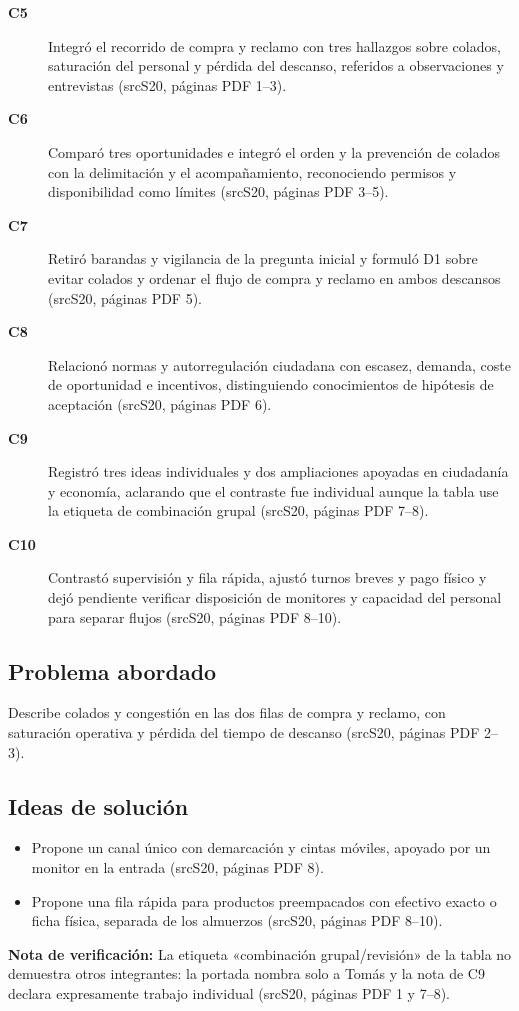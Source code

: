 \documentclass[11pt,a4paper]{article}
\newcommand{\evid}[2]{(\csname src#1\endcsname, páginas PDF #2)}
\begin{document}
\begin{description}
\item[\textbf{C5}] Integró el recorrido de compra y reclamo con tres hallazgos sobre colados, saturación del personal y pérdida del descanso, referidos a observaciones y entrevistas \evid{S20}{1--3}.
\item[\textbf{C6}] Comparó tres oportunidades e integró el orden y la prevención de colados con la delimitación y el acompañamiento, reconociendo permisos y disponibilidad como límites \evid{S20}{3--5}.
\item[\textbf{C7}] Retiró barandas y vigilancia de la pregunta inicial y formuló D1 sobre evitar colados y ordenar el flujo de compra y reclamo en ambos descansos \evid{S20}{5}.
\item[\textbf{C8}] Relacionó normas y autorregulación ciudadana con escasez, demanda, coste de oportunidad e incentivos, distinguiendo conocimientos de hipótesis de aceptación \evid{S20}{6}.
\item[\textbf{C9}] Registró tres ideas individuales y dos ampliaciones apoyadas en ciudadanía y economía, aclarando que el contraste fue individual aunque la tabla use la etiqueta de combinación grupal \evid{S20}{7--8}.
\item[\textbf{C10}] Contrastó supervisión y fila rápida, ajustó turnos breves y pago físico y dejó pendiente verificar disposición de monitores y capacidad del personal para separar flujos \evid{S20}{8--10}.
\end{description}
\subsection*{Problema abordado}
Describe colados y congestión en las dos filas de compra y reclamo, con saturación operativa y pérdida del tiempo de descanso \evid{S20}{2--3}.
\subsection*{Ideas de solución}
\begin{itemize}
\item Propone un canal único con demarcación y cintas móviles, apoyado por un monitor en la entrada \evid{S20}{8}.
\item Propone una fila rápida para productos preempacados con efectivo exacto o ficha física, separada de los almuerzos \evid{S20}{8--10}.
\end{itemize}
{\small\textbf{Nota de verificación:} La etiqueta «combinación grupal/revisión» de la tabla no demuestra otros integrantes: la portada nombra solo a Tomás y la nota de C9 declara expresamente trabajo individual \evid{S20}{1 y 7--8}.}
\clearpage
\end{document}
